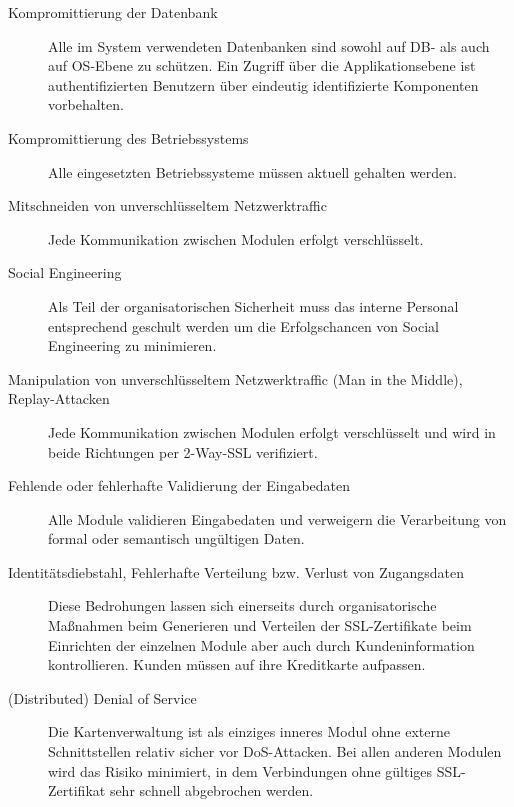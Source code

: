 \documentclass[12pt,a4paper,titlepage,oneside]{scrartcl}
\begin{document}
\begin{description}
	\item[Kompromittierung der Datenbank]
		Alle im System verwendeten Datenbanken sind sowohl auf DB- als auch auf OS-Ebene
		zu schützen. Ein Zugriff über die Applikationsebene ist authentifizierten
		Benutzern über eindeutig identifizierte Komponenten vorbehalten.
		
	\item[Kompromittierung des Betriebssystems]
		Alle eingesetzten Betriebssysteme müssen aktuell gehalten werden.
		
	\item[Mitschneiden von unverschlüsseltem Netzwerktraffic]
		Jede Kommunikation zwischen Modulen erfolgt verschlüsselt.
		
	\item[Social Engineering]
		Als Teil der organisatorischen Sicherheit muss das interne Personal entsprechend
		geschult werden um die Erfolgschancen von Social Engineering zu minimieren.

	\item[Manipulation von unverschlüsseltem Netzwerktraffic (Man in the Middle), Replay-Attacken]
		Jede Kommunikation zwischen Modulen erfolgt verschlüsselt und wird in beide
		Richtungen per 2-Way-SSL verifiziert.
		
	\item[Fehlende oder fehlerhafte Validierung der Eingabedaten]
		Alle Module validieren Eingabedaten und verweigern die Verarbeitung von
		formal oder semantisch ungültigen Daten.
		
	\item[Identitätsdiebstahl, Fehlerhafte Verteilung bzw. Verlust von Zugangsdaten]
		Diese Bedrohungen lassen sich einerseits durch organisatorische Maßnahmen beim
		Generieren und Verteilen der SSL-Zertifikate beim Einrichten der einzelnen
		Module aber auch durch Kundeninformation kontrollieren. Kunden müssen
		auf ihre Kreditkarte aufpassen.
		
	\item[(Distributed) Denial of Service]
		Die Kartenverwaltung ist als einziges inneres Modul ohne externe Schnittstellen
		relativ sicher vor DoS-Attacken. Bei allen anderen Modulen wird das Risiko
		minimiert, in dem Verbindungen ohne gültiges SSL-Zertifikat sehr schnell
		abgebrochen werden.
		
\end{description}
\end{document}
